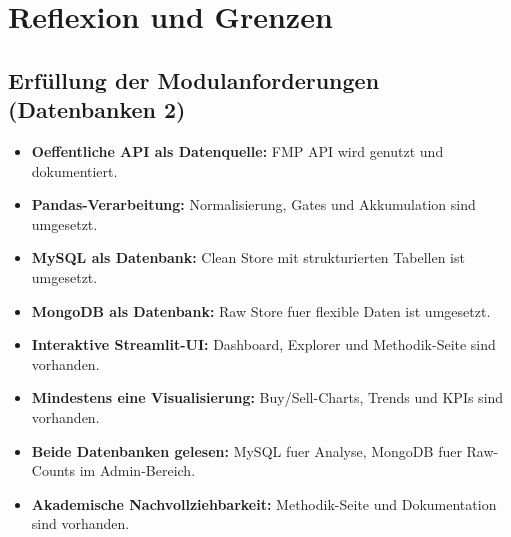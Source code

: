 \section{Reflexion und Grenzen}

\subsection{Erfüllung der Modulanforderungen (Datenbanken 2)}
\begin{itemize}
  \item \textbf{Oeffentliche API als Datenquelle:} FMP API wird genutzt und dokumentiert. %
  \item \textbf{Pandas-Verarbeitung:} Normalisierung, Gates und Akkumulation sind umgesetzt. %
  \item \textbf{MySQL als Datenbank:} Clean Store mit strukturierten Tabellen ist umgesetzt. %
  \item \textbf{MongoDB als Datenbank:} Raw Store fuer flexible Daten ist umgesetzt. %
  \item \textbf{Interaktive Streamlit-UI:} Dashboard, Explorer und Methodik-Seite sind vorhanden. %
  \item \textbf{Mindestens eine Visualisierung:} Buy/Sell-Charts, Trends und KPIs sind vorhanden. %
  \item \textbf{Beide Datenbanken gelesen:} MySQL fuer Analyse, MongoDB fuer Raw-Counts im Admin-Bereich. %
  \item \textbf{Akademische Nachvollziehbarkeit:} Methodik-Seite und Dokumentation sind vorhanden. %
\end{itemize}

